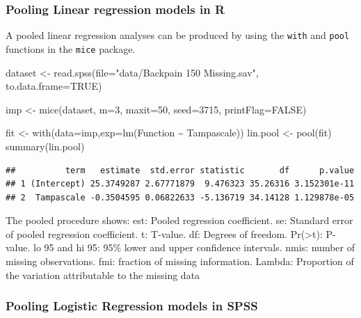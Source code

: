 \documentclass[
]{book}
\newenvironment{Shaded}{\begin{snugshade}}{\end{snugshade}}
\newcommand{\AttributeTok}[1]{\textcolor[rgb]{0.77,0.63,0.00}{#1}}
\newcommand{\ConstantTok}[1]{\textcolor[rgb]{0.00,0.00,0.00}{#1}}
\newcommand{\DecValTok}[1]{\textcolor[rgb]{0.00,0.00,0.81}{#1}}
\newcommand{\FunctionTok}[1]{\textcolor[rgb]{0.00,0.00,0.00}{#1}}
\newcommand{\NormalTok}[1]{#1}
\newcommand{\OtherTok}[1]{\textcolor[rgb]{0.56,0.35,0.01}{#1}}
\newcommand{\SpecialCharTok}[1]{\textcolor[rgb]{0.00,0.00,0.00}{#1}}
\newcommand{\StringTok}[1]{\textcolor[rgb]{0.31,0.60,0.02}{#1}}
\begin{document}
\hypertarget{pooling-linear-regression-models-in-r}{%
\subsubsection{Pooling Linear regression models in R}\label{pooling-linear-regression-models-in-r}}

A pooled linear regression analyses can be produced by using the \texttt{with} and \texttt{pool} functions in the \texttt{mice} package.

\begin{Shaded}
\begin{Highlighting}[]
\NormalTok{dataset }\OtherTok{\textless{}{-}} \FunctionTok{read.spss}\NormalTok{(}\AttributeTok{file=}\StringTok{"data/Backpain 150 Missing.sav"}\NormalTok{, }\AttributeTok{to.data.frame=}\ConstantTok{TRUE}\NormalTok{)}

\NormalTok{imp }\OtherTok{\textless{}{-}} \FunctionTok{mice}\NormalTok{(dataset, }\AttributeTok{m=}\DecValTok{3}\NormalTok{, }\AttributeTok{maxit=}\DecValTok{50}\NormalTok{, }\AttributeTok{seed=}\DecValTok{3715}\NormalTok{, }\AttributeTok{printFlag=}\ConstantTok{FALSE}\NormalTok{)}

\NormalTok{fit }\OtherTok{\textless{}{-}} \FunctionTok{with}\NormalTok{(}\AttributeTok{data=}\NormalTok{imp,}\AttributeTok{exp=}\FunctionTok{lm}\NormalTok{(Function }\SpecialCharTok{\textasciitilde{}}\NormalTok{ Tampascale))}
\NormalTok{lin.pool }\OtherTok{\textless{}{-}} \FunctionTok{pool}\NormalTok{(fit)}
\FunctionTok{summary}\NormalTok{(lin.pool)}
\end{Highlighting}
\end{Shaded}

\begin{verbatim}
##          term   estimate  std.error statistic       df      p.value
## 1 (Intercept) 25.3749287 2.67771879  9.476323 35.26316 3.152301e-11
## 2  Tampascale -0.3504595 0.06822633 -5.136719 34.14128 1.129878e-05
\end{verbatim}

The pooled procedure shows:
est: Pooled regression coefficient.
se: Standard error of pooled regression coefficient.
t: T-value.
df: Degrees of freedom.
Pr(\textgreater\textbar t\textbar): P-value.
lo 95 and hi 95: 95\% lower and upper confidence intervals.
nmis: number of missing observations.
fmi: fraction of missing information.
Lambda: Proportion of the variation attributable to the missing data

\hypertarget{pooling-logistic-regression-models-in-spss}{%
\subsubsection{Pooling Logistic Regression models in SPSS}\label{pooling-logistic-regression-models-in-spss}}
\end{document}
